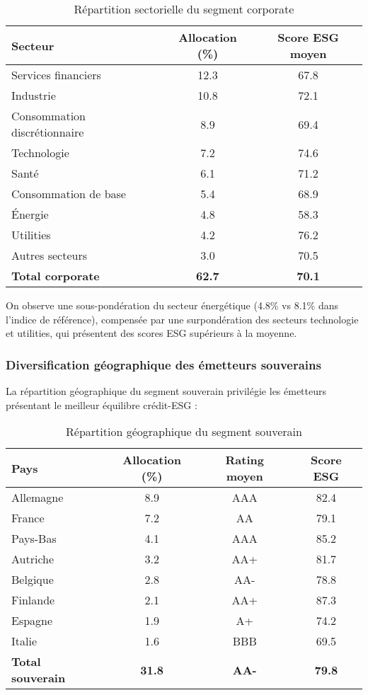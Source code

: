 \begin{table}[h!]
\centering
\begin{tabular}{lcc}
\hline
\textbf{Secteur} & \textbf{Allocation (\%)} & \textbf{Score ESG moyen} \\
\hline
Services financiers & 12.3 & 67.8 \\
Industrie & 10.8 & 72.1 \\
Consommation discrétionnaire & 8.9 & 69.4 \\
Technologie & 7.2 & 74.6 \\
Santé & 6.1 & 71.2 \\
Consommation de base & 5.4 & 68.9 \\
Énergie & 4.8 & 58.3 \\
Utilities & 4.2 & 76.2 \\
Autres secteurs & 3.0 & 70.5 \\
\hline
\textbf{Total corporate} & \textbf{62.7} & \textbf{70.1} \\
\hline
\end{tabular}
\caption{Répartition sectorielle du segment corporate}
\end{table}

On observe une sous-pondération du secteur énergétique (4.8\% vs 8.1\% dans l'indice de référence), compensée par une surpondération des secteurs technologie et utilities, qui présentent des scores ESG supérieurs à la moyenne.

\subsubsection{Diversification géographique des émetteurs souverains}

La répartition géographique du segment souverain privilégie les émetteurs présentant le meilleur équilibre crédit-ESG :

\begin{table}[h!]
\centering
\begin{tabular}{lccc}
\hline
\textbf{Pays} & \textbf{Allocation (\%)} & \textbf{Rating moyen} & \textbf{Score ESG} \\
\hline
Allemagne & 8.9 & AAA & 82.4 \\
France & 7.2 & AA & 79.1 \\
Pays-Bas & 4.1 & AAA & 85.2 \\
Autriche & 3.2 & AA+ & 81.7 \\
Belgique & 2.8 & AA- & 78.8 \\
Finlande & 2.1 & AA+ & 87.3 \\
Espagne & 1.9 & A+ & 74.2 \\
Italie & 1.6 & BBB & 69.5 \\
\hline
\textbf{Total souverain} & \textbf{31.8} & \textbf{AA-} & \textbf{79.8} \\
\hline
\end{tabular}
\caption{Répartition géographique du segment souverain}
\end{table}

